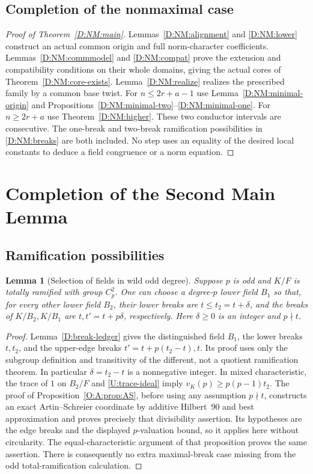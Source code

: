\documentclass[11pt]{amsart}
\newtheorem{lemma}[theorem]{Lemma}
\theoremstyle{definition}
\theoremstyle{remark}
\begin{document}
\subsection{Completion of the nonmaximal case}
\begin{proof}[Proof of Theorem~\ref{D:NM:main}]
Lemmas~\ref{D:NM:alignment} and \ref{D:NM:lower} construct an actual common origin
and full norm-character coefficients. Lemmas~\ref{D:NM:commmodel} and
\ref{D:NM:compat} prove the extension and compatibility conditions on their
whole domains, giving the actual cores of Theorem~\ref{D:NM:core-exists}.
Lemma~\ref{D:NM:realize} realizes the prescribed family by a common base twist.
For $n\le2r+a-1$ use Lemma~\ref{D:NM:minimal-origin} and
Propositions~\ref{D:NM:minimal-two}--\ref{D:NM:minimal-one}.
For $n\ge2r+a$ use Theorem~\ref{D:NM:higher}.
These two conductor intervals are consecutive. The one-break and two-break
ramification possibilities in \eqref{D:NM:breaks} are both included.
No step uses an equality of the desired local constants to deduce a
field congruence or a norm equation.
\end{proof}


\section{Completion of the Second Main Lemma}\label{sec:completion}
\subsection{Ramification possibilities}\label{U:exhaustion}
\begin{lemma}[Selection of fields in wild odd degree]\label{U:odd-selection}
Suppose $p$ is odd and $K/F$ is totally ramified with group $C_p^2$.
One can choose a degree-$p$ lower field $B_1$ so that, for every other
lower field $B_2$, their lower breaks are $t\le t_2=t+\delta$, and the
breaks of $K/B_2,K/B_1$ are $t,t'=t+p\delta$, respectively.
Here $\delta\ge0$ is an integer and $p\nmid t$.
\end{lemma}
\begin{proof}
Lemma~\ref{D:break-ledger} gives the distinguished field $B_1$,
the lower breaks $t,t_2$, and the upper-edge breaks
$t'=t+p(t_2-t),t$. Its proof uses only the subgroup definition and
transitivity of the different, not a quotient ramification theorem.
In particular $\delta=t_2-t$ is a nonnegative integer.
In mixed characteristic, the trace of $1$ on $B_2/F$ and
\eqref{U:trace-ideal} imply $v_K(p)\ge p(p-1)t_2$.
The proof of Proposition~\ref{O:A:prop:AS}, before using any assumption
$p\nmid t$, constructs an exact Artin--Schreier coordinate by additive
Hilbert~90 and best approximation and proves precisely that divisibility
assertion. Its hypotheses are the edge breaks and the displayed
$p$-valuation bound, so it applies here without circularity.
The equal-characteristic argument of that proposition proves the same
assertion. There is consequently no extra maximal-break case missing from
the odd total-ramification calculation.
\end{proof}
\end{document}
